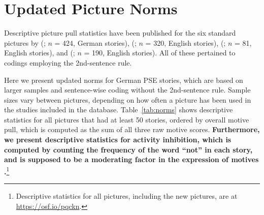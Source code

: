 \documentclass[man,a4paper,mask]{apa6}\usepackage[]{graphicx}\usepackage[]{color}
\newcommand{\added}[1]{\textcolor{colour_added}{\bf{#1}}}
\begin{document}
\section{Updated Picture Norms}

Descriptive picture pull statistics have been published for the six standard pictures by \citeauthor{schultheiss_AssessmentImplicitMotives_2001} (\citeyear{schultheiss_AssessmentImplicitMotives_2001}; $n$ = 424, German stories), \citeauthor{pang_assessing_2005} (\citeyear{pang_assessing_2005}; $n$ = 320, English stories), \citeauthor{pang_ContentCodingMethods_2010} (\citeyear{pang_ContentCodingMethods_2010}; $n$ = 81, English stories), and \citeauthor{schultheiss_AreImplicitExplicit_2009} (\citeyear{schultheiss_AreImplicitExplicit_2009}; $n$ = 190, English stories). All of these pertained to codings employing the 2nd-sentence rule.

Here we present updated norms for German PSE stories, which are based on larger samples and sentence-wise coding without the 2nd-sentence rule. Sample sizes vary between pictures, depending on how often a picture has been used in the studies included in the database. Table~\ref{tab:norms} shows descriptive statistics for all pictures that had at least 50 stories, ordered by overall motive pull, which is computed as the sum of all three raw motive scores. \added{Furthermore, we present descriptive statistics for activity inhibition, which is computed by counting the frequency of the word ``not'' in each story, and is supposed to be a moderating factor in the expression of motives \parencite{langens_ActivityInhibition_2010}.}\footnote{Descriptive statistics for all pictures, including the new pictures, are at \url{https://osf.io/pqckn}.}
\end{document}
